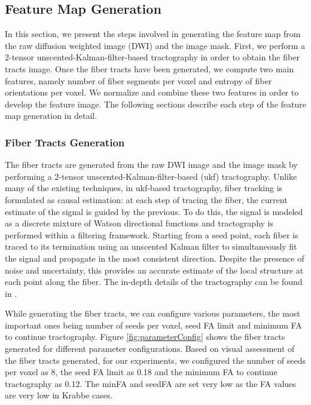 \documentclass{llncs}
\begin{document}
%
\subsection{Feature Map Generation}
\label{subsec:FeatureMap}
%
In this section, we present the steps involved in generating the feature map from the raw diffusion weighted image (DWI) and the image mask. First, we perform a 2-tensor unscented-Kalman-filter-based tractography \cite{malc10} in order to obtain the fiber tracts image. Once the fiber tracts have been generated, we compute two main features, namely number of fiber segments per voxel and entropy of fiber orientations per voxel.  We normalize and combine these two features in order to develop the feature image. The following sections describe each step of the feature map generation in detail.

%
\subsubsection{Fiber Tracts Generation}
%
The fiber tracts are generated from the raw DWI image and the image mask by performing a 2-tensor unscented-Kalman-filter-based (ukf) tractography. Unlike many of the existing techniques, in ukf-based tractography, fiber tracking is formulated as causal estimation: at each step of tracing the fiber, the current estimate of the signal is guided by the previous. To do this, the signal is modeled as a discrete mixture of Watson directional functions and tractography is performed within a filtering framework. Starting from a seed point, each fiber is traced to its termination using an unscented Kalman filter to simultaneously fit the signal and propagate in the most consistent direction. Despite the presence of noise and uncertainty, this provides an accurate estimate of the local structure at each point along the fiber. The in-depth details of the tractography can be found in \cite{malc10}.  

While generating the fiber tracts, we can configure various parameters, the most important ones being number of seeds per voxel, seed FA limit and minimum FA to continue tractography. Figure \ref{fig:parameterConfig} shows the fiber tracts generated for different parameter configurations. Based on visual assessment of the fiber tracts generated, for our experiments, we configured the number of seeds per voxel as 8, the seed FA limit as 0.18 and the minimum FA to continue tractography as 0.12. The minFA and seedFA are set very low as the FA values are very low in Krabbe cases.
\end{document}
